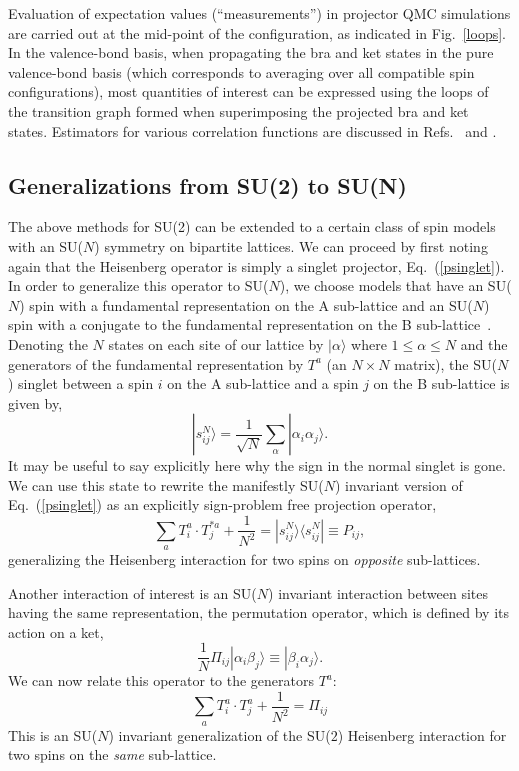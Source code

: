 \documentclass[range]{ar2e}
\begin{document}
Evaluation of expectation values (``measurements'') in projector QMC simulations are carried out at the mid-point of the configuration, as indicated 
in Fig.~\ref{loops}. In the valence-bond basis, when propagating the bra and ket states in the pure valence-bond basis (which corresponds to averaging 
over all compatible spin configurations), most quantities of interest can be expressed using the loops of the transition graph formed when superimposing 
the projected bra and ket states. Estimators for various correlation functions are discussed in Refs.~\cite{Beach06} and \cite{Tang11a}.

\subsection {Generalizations from SU(2) to SU(N)}
\label{ss:su2N}

The above methods for SU(2) can be extended to a certain class of spin models with an SU($N$) symmetry on bipartite lattices. We can proceed 
by first noting again that the Heisenberg operator is simply a singlet projector, Eq.~(\ref{psinglet}). In order to generalize this operator
to SU($N$), we choose models that have an SU($N$) spin with a fundamental representation on the A sub-lattice and an SU($N$) spin with a conjugate 
to the fundamental representation on the B sub-lattice~\cite{affleck1985:lgN,Read89}. Denoting the $N$ states on each site of our lattice 
by $|\alpha\rangle$ where $1\leq \alpha \leq N$ and the generators of the fundamental representation by $T^a$ (an $N\times N$ matrix),
the SU($N$) singlet between a spin $i$ on the A sub-lattice and a spin $j$ on the B sub-lattice is given by, 
\begin{equation}
|s^N_{ij}\rangle = \frac{1}{\sqrt{N}}\sum_\alpha |\alpha_i\alpha_j\rangle. 
\end{equation}
{\color{red} It may be useful to say explicitly here why the sign in the normal singlet is gone.}
We can use this state to rewrite the manifestly SU($N$) invariant version of Eq.~(\ref{psinglet}) as an explicitly sign-problem 
free projection operator,
\begin{equation}
\sum_a T^a_i \cdot
T^{*a}_j + \frac{1}{N^2} = |s^N_{ij}\rangle \langle s^N_{ij}|\equiv P_{ij},
\end{equation}
generalizing the Heisenberg interaction for two spins on {\em opposite} sub-lattices. 

Another interaction of interest is an SU($N$) invariant interaction between sites having the same representation, the permutation
operator, which is defined by its action on a ket, 
\begin{equation}
\frac{1}{N}\Pi_{ij}|\alpha_i\beta_j\rangle \equiv |\beta_i\alpha_j\rangle. 
\end{equation}
We can now relate this operator to the generators $T^a$:
\begin{equation}
\sum_a T^a_i \cdot
T^{a}_j +\frac{1}{N^2} =\Pi_{ij}
\end{equation}
This is an SU($N$) invariant generalization of the SU($2$) Heisenberg interaction for two spins on the {\em same} sub-lattice.
\end{document}
